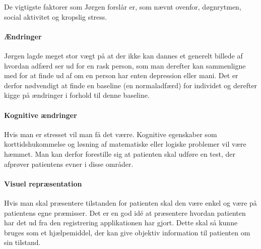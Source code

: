 De vigtigste faktorer som Jørgen forslår er, som nævnt ovenfor, døgnrytmen, social aktivitet og kropslig stress.

\paragraph{Ændringer}
Jørgen lagde meget stor vægt på at der ikke kan dannes et generelt billede af hvordan adfærd ser ud for en rask person, som man derefter kan sammenligne med for at finde ud af om en person har enten depression eller mani.
Det er derfor nødvendigt at finde en baseline (en normaladfærd) for individet og derefter kigge på ændringer i forhold til denne baseline.

\paragraph{Kognitive ændringer}
Hvis man er stresset vil man få det værre. 
Kognitive egenskaber som korttidshukommelse og løsning af matematiske eller logiske problemer vil være hæmmet.
Man kan derfor forestille sig at patienten skal udføre en test, der afprøver patientens evner i disse områder.

\paragraph{Visuel repræsentation}
Hvis man skal præsentere tilstanden for patienten skal den være enkel og være på patientens egne præmisser. 
Det er en god idé at præsentere hvordan patienten har det ud fra den registrering applikationen har gjort. 
Dette skal så kunne bruges som et hjælpemiddel, der kan give objektiv information til patienten om sin tilstand.
